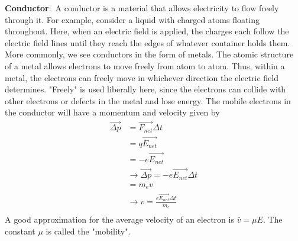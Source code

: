 \documentclass[nobib]{tufte-handout}
\newcommand{\defn}[2]{\noindent\textbf{#1}:\ #2}
\begin{document}
\defn{Conductor}{A conductor is a material 
that allows electricity to flow freely through it}. 
For example, consider a liquid with charged atoms floating
throughout.
Here, when an electric field is applied,
the charges each follow the electric field lines
until they reach the edges of whatever container holds them. 
More commonly, we see conductors in the form of metals. 
The atomic structure of a metal allows electrons to move freely
from atom to atom. Thus, within a metal, the electrons can freely 
move in whichever direction the electric field determines.
"Freely" is used liberally here, since the electrons 
can collide with other electrons or defects in the metal and lose energy.
The mobile electrons in 
the conductor will have a momentum and velocity given by 
\begin{align*}
    \vec{\Delta p} &= \vec{F_{net}} \Delta t \\
    &= q\vec{E_{net}} \\
    &= -e \vec{E_{net}} \\
    &\rightarrow \vec{\Delta p} = -e \vec{E_{net}} \Delta t \\
    &= m_e v \\
    &\rightarrow v = \frac{e \vec{E_{net}} \Delta t}{m_e}\\
\end{align*}
A good approximation for the average velocity of 
an electron is $\bar{v} = \mu E$. The constant $\mu$ is called
the "mobility". 
\end{document}

